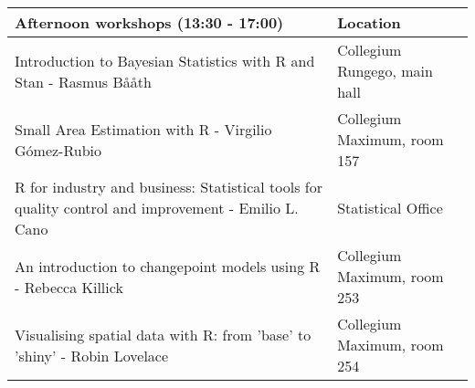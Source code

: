 \begingroup\fontsize{9pt}{10pt}\selectfont
\begin{longtable}{|p{8.2cm}|p{4.6cm}|}
  \hline
Afternoon workshops (13:30 - 17:00) & Location \\ 
  \hline
Introduction to Bayesian Statistics with R and Stan - Rasmus Bååth & Collegium Rungego, main hall \\ 
  Small Area Estimation with R - Virgilio Gómez-Rubio & Collegium Maximum, room 157 \\ 
  R for industry and business: Statistical tools for quality control and improvement - Emilio L. Cano & Statistical Office\\ 
  An introduction to changepoint models using R - Rebecca Killick & Collegium Maximum, room 253 \\ 
  Visualising spatial data with R: from 'base' to 'shiny' - Robin Lovelace & Collegium Maximum, room 254 \\ 
   \hline
\end{longtable}
\endgroup
